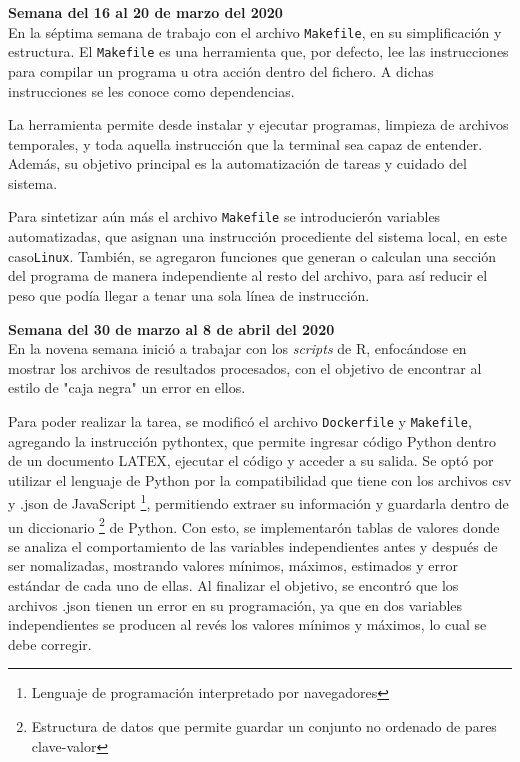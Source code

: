 \documentclass{article}
\begin{document}
    \textbf{Semana  del 16 al 20 de marzo del 2020} \\
    En la séptima semana de trabajo con el archivo \texttt{Makefile}, en su simplificación y estructura. El \texttt{Makefile} es una herramienta que, por defecto, lee las instrucciones para compilar un programa u otra acción dentro del fichero. A dichas instrucciones se les conoce como dependencias.
    
    La herramienta permite desde instalar y ejecutar programas, limpieza de archivos temporales, y toda aquella instrucción que la terminal sea capaz de entender. Además, su objetivo principal es la automatización de tareas y cuidado del sistema. 
    
    Para sintetizar aún más el archivo \texttt{Makefile} se introducierón variables automatizadas, que asignan una instrucción procediente del sistema local, en este caso\texttt{Linux}. También, se agregaron funciones que generan o calculan una sección del programa de manera independiente al resto del archivo, para así reducir el peso que podía llegar a tenar una sola línea de instrucción.
    
    \textbf{Semana  del 30 de marzo al 8 de abril del 2020} \\
    En la novena semana inició a trabajar con los \textit{scripts} de R, enfocándose en mostrar los archivos de resultados procesados, con el objetivo de encontrar al estilo de "caja negra" un error en ellos.
    
    Para poder realizar la tarea, se modificó el archivo \texttt{Dockerfile} y \texttt{Makefile}, agregando la instrucción pythontex, que permite ingresar código Python dentro de un documento LATEX, ejecutar el código y acceder a su salida. Se optó por utilizar el lenguaje de Python por la compatibilidad que tiene con los archivos csv y .json de JavaScript \footnote{Lenguaje de programación interpretado por navegadores}, permitiendo extraer su información y guardarla dentro de un diccionario \footnote{Estructura de datos que permite guardar un conjunto no ordenado de pares clave-valor} de Python. Con esto, se implementarón tablas de valores donde se analiza el comportamiento de las variables independientes antes y después de ser nomalizadas, mostrando valores mínimos, máximos, estimados y error estándar de cada uno de ellas.
    Al finalizar el objetivo, se encontró que los archivos .json tienen un error en su programación, ya que en dos variables independientes se producen al revés los valores mínimos y máximos, lo cual se debe corregir.
    
\end{document}
